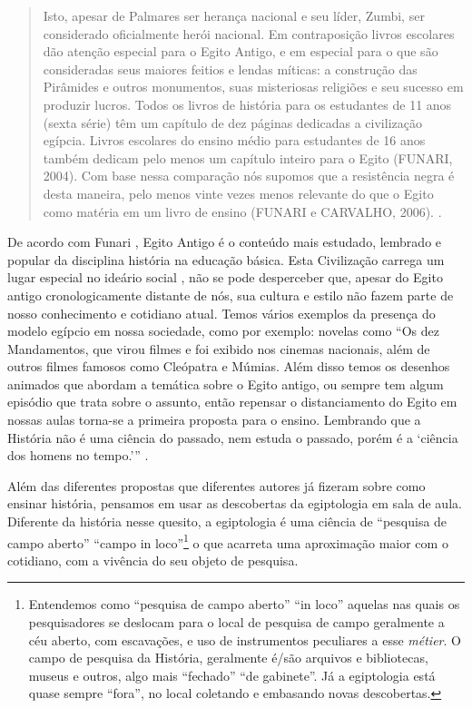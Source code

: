 \begin{refsection}
    \begin{quotation}
        Isto, apesar de Palmares ser herança nacional e seu líder, Zumbi, ser considerado oficialmente herói nacional. Em contraposição livros escolares dão atenção especial para o Egito Antigo, e em especial para o que são consideradas seus maiores feitios e lendas míticas: a construção das Pirâmides e outros monumentos, suas misteriosas religiões e seu sucesso em produzir lucros. Todos os livros de história para os estudantes de 11 anos (sexta série) têm um capítulo de dez páginas dedicadas a civilização egípcia. Livros escolares do ensino médio para estudantes de 16 anos também dedicam pelo menos um capítulo inteiro para o Egito (FUNARI, 2004). Com base nessa comparação nós supomos que a resistência negra é desta maneira, pelo menos vinte vezes menos relevante do que o Egito como matéria em um livro de ensino (FUNARI e CARVALHO, 2006). \cite{FunariAndCarvalho2015Palmares}.
    \end{quotation}

    De acordo com Funari \citeyear{FunariAndCarvalho2015Palmares}, Egito Antigo é o conteúdo mais estudado, lembrado e popular da disciplina história na educação básica. Esta Civilização carrega um lugar especial no ideário social \cite{Silva2014Sorriso}, não se pode desperceber que, apesar do Egito antigo cronologicamente distante de nós, sua cultura e estilo não fazem parte de nosso conhecimento e cotidiano atual. Temos vários exemplos da presença do modelo egípcio em nossa sociedade, como por exemplo: novelas como ``Os dez Mandamentos, que virou filmes e foi exibido nos cinemas nacionais, além de outros filmes famosos como Cleópatra e Múmias. Além disso temos os desenhos animados que abordam a temática sobre o Egito antigo, ou sempre tem algum episódio que trata sobre o assunto, então repensar o distanciamento do Egito em nossas aulas torna-se a primeira proposta para o ensino. Lembrando que a História não é uma ciência do passado, nem estuda o passado, porém é a `ciência dos homens no tempo.'{}'' \cite[p.~32]{Bloch2001Apologia}.

    Além das diferentes propostas que diferentes autores já fizeram sobre como ensinar história, pensamos em usar as descobertas da egiptologia em sala de aula. Diferente da história nesse quesito, a egiptologia é uma ciência de ``pesquisa de campo aberto'' ``campo in loco''\footnote{Entendemos como ``pesquisa de campo aberto'' ``in loco'' aquelas nas quais os pesquisadores se deslocam para o local de pesquisa de campo geralmente a céu aberto, com escavações, e uso de instrumentos peculiares a esse \textit{métier}. O campo de pesquisa da História, geralmente é/são arquivos e bibliotecas, museus e outros, algo mais ``fechado'' ``de gabinete''. Já a egiptologia está quase sempre ``fora'', no local coletando e embasando novas descobertas.} o que acarreta uma aproximação maior com o cotidiano, com a vivência do seu objeto de pesquisa.  


\end{refsection}
